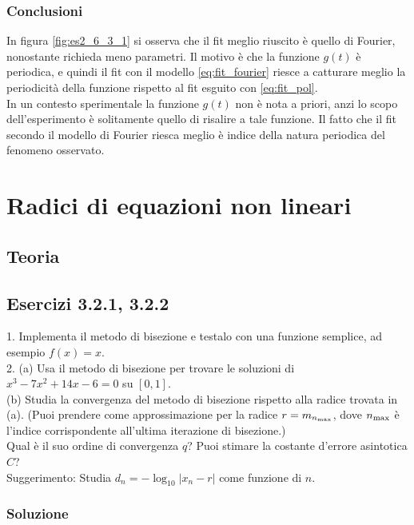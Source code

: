 \documentclass[letterpaper, 12pt]{article}
\begin{document}
\subsubsection{Conclusioni}
In figura \ref{fig:es2_6_3_1} si osserva che il fit meglio riuscito è quello di Fourier, nonostante
richieda meno parametri. Il motivo è che la funzione $g(t)$ è periodica, e quindi il fit con il modello 
\ref{eq:fit_fourier} riesce a catturare meglio la periodicità della funzione rispetto al fit esguito con 
\ref{eq:fit_pol}. \\
In un contesto sperimentale la funzione $g(t)$ non è nota a priori, anzi lo scopo dell'esperimento è 
solitamente quello di risalire a tale funzione. Il fatto che il fit secondo il modello di Fourier riesca meglio
è indice della natura periodica del fenomeno osservato. 

\section{Radici di equazioni non lineari}
\subsection{Teoria}

\subsection{Esercizi 3.2.1, 3.2.2}
1. Implementa il metodo di bisezione e testalo con una funzione semplice, ad esempio $f(x)=x$. \\
2. (a) Usa il metodo di bisezione per trovare le soluzioni di $x^3 - 7x^2 + 14x - 6 = 0$ su $[0,1]$.\\
   (b) Studia la convergenza del metodo di bisezione rispetto alla radice trovata in (a). 
   (Puoi prendere come approssimazione per la radice $r=m_{n_{\rm max}}$, dove $n_{\rm max}$ è 
   l'indice corrispondente all'ultima iterazione di bisezione.) \\
   Qual è il suo ordine di convergenza $q$? Puoi stimare la costante d'errore asintotica $C$? \\
   Suggerimento: Studia $d_n=-\log_{10}|x_{n}-r|$ come funzione di $n$.

\subsubsection{Soluzione}
\end{document}
